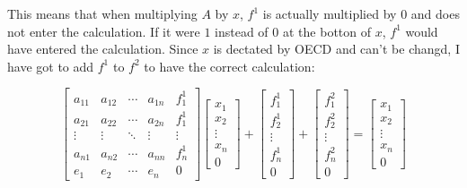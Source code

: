 \documentclass[12pt]{article}
\begin{document}
This means that when multiplying $A$ by $x$, $f^1$ is actually multiplied by $0$ and does not enter the calculation.
If it were $1$ instead of $0$ at the botton of $x$, $f^1$ would have entered the calculation.
Since $x$ is dectated by OECD and can't be changd, I have got to add $f^1$ to $f^2$ to have the correct calculation:

\[
\begin{bmatrix}
a_{11} & a_{12} & \cdots & a_{1n} & f^{1}_{1} \\
a_{21} & a_{22} & \cdots & a_{2n} & f^{1}_{1}\\
\vdots & \vdots & \ddots & \vdots  & \vdots        \\
a_{n1} & a_{n2} & \cdots & a_{nn} & f^{1}_{n} \\
e_1      & e_2      & \cdots & e_n     & 0
\end{bmatrix}
\begin{bmatrix}
x_1 \\ x_2 \\ \vdots \\ x_n \\ 0
\end{bmatrix}
+
\begin{bmatrix}
f^1_1 \\ f^1_2 \\ \vdots \\ f^1_n \\ 0
\end{bmatrix}
+
\begin{bmatrix}
f^2_1 \\ f^2_2 \\ \vdots \\ f^2_n \\ 0
\end{bmatrix}
=
\begin{bmatrix}
x_1 \\ x_2 \\ \vdots \\ x_n \\ 0
\end{bmatrix}
\]
\end{document}
